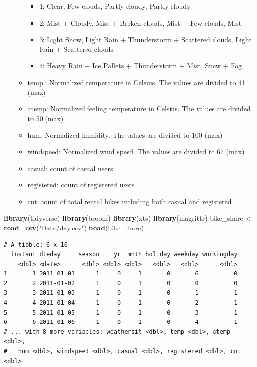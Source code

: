 \documentclass[]{book}
\newenvironment{Shaded}{\begin{snugshade}}{\end{snugshade}}
\newcommand{\KeywordTok}[1]{\textcolor[rgb]{0.13,0.29,0.53}{\textbf{#1}}}
\newcommand{\NormalTok}[1]{#1}
\newcommand{\StringTok}[1]{\textcolor[rgb]{0.31,0.60,0.02}{#1}}
\providecommand{\tightlist}{%
  \setlength{\itemsep}{0pt}\setlength{\parskip}{0pt}}
\begin{document}
\begin{itemize}
\begin{itemize}
    \begin{itemize}
    \tightlist
    \item
      1: Clear, Few clouds, Partly cloudy, Partly cloudy
    \item
      2: Mist + Cloudy, Mist + Broken clouds, Mist + Few clouds, Mist
    \item
      3: Light Snow, Light Rain + Thunderstorm + Scattered clouds, Light Rain + Scattered clouds
    \item
      4: Heavy Rain + Ice Pallets + Thunderstorm + Mist, Snow + Fog
    \end{itemize}
  \item
    temp : Normalized temperature in Celsius. The values are divided to 41 (max)
  \item
    atemp: Normalized feeling temperature in Celsius. The values are divided to 50 (max)
  \item
    hum: Normalized humidity. The values are divided to 100 (max)
  \item
    windspeed: Normalized wind speed. The values are divided to 67 (max)
  \item
    casual: count of casual users
  \item
    registered: count of registered users
  \item
    cnt: count of total rental bikes including both casual and registered
  \end{itemize}
\end{itemize}

\begin{Shaded}
\begin{Highlighting}[]
\KeywordTok{library}\NormalTok{(tidyverse)}
\KeywordTok{library}\NormalTok{(broom)}
\KeywordTok{library}\NormalTok{(xts)}
\KeywordTok{library}\NormalTok{(magrittr)}
\NormalTok{bike_share <-}\StringTok{ }\KeywordTok{read_csv}\NormalTok{(}\StringTok{"Data/day.csv"}\NormalTok{)}
\KeywordTok{head}\NormalTok{(bike_share)}
\end{Highlighting}
\end{Shaded}

\begin{verbatim}
# A tibble: 6 x 16
  instant dteday     season    yr  mnth holiday weekday workingday
    <dbl> <date>      <dbl> <dbl> <dbl>   <dbl>   <dbl>      <dbl>
1       1 2011-01-01      1     0     1       0       6          0
2       2 2011-01-02      1     0     1       0       0          0
3       3 2011-01-03      1     0     1       0       1          1
4       4 2011-01-04      1     0     1       0       2          1
5       5 2011-01-05      1     0     1       0       3          1
6       6 2011-01-06      1     0     1       0       4          1
# ... with 8 more variables: weathersit <dbl>, temp <dbl>, atemp <dbl>,
#   hum <dbl>, windspeed <dbl>, casual <dbl>, registered <dbl>, cnt <dbl>
\end{verbatim}
\end{document}
